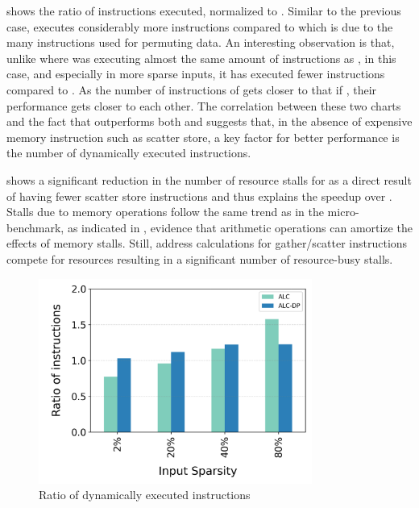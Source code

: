  shows the ratio of instructions executed, normalized to \ifconv. Similar to the previous case, \ALCdp executes considerably more instructions compared to \ALC which is due to the many instructions used for permuting data. An interesting observation is that, unlike  where \ALC was executing almost the same amount of instructions as \ifconv, in this case, and especially in more sparse inputs, it has executed fewer instructions compared to \ifconv.
As the number of instructions of \ALC gets closer to that if \ifconv, their performance gets closer to each other. The correlation between these two charts and the fact that \ALCdp outperforms both \ALC and \ifconv suggests that, in the absence of expensive memory instruction such as scatter store, a key factor for better performance is the number of dynamically executed instructions.

 shows a significant reduction in the number of resource stalls for \ALCdp as a direct result of having fewer scatter store instructions and thus explains the speedup over \ifconv.
Stalls due to memory operations follow the same trend as in the \ifElseBench micro-benchmark, as indicated in , evidence that arithmetic operations can amortize the effects of memory stalls.
Still, address calculations for gather/scatter instructions compete for resources resulting in a significant number of resource-busy stalls. 



\begin{figure}[h!]
  \includegraphics[width=0.8\textwidth]{Figures/Evaluations/single_if_many_scatter_instr.png}
  \caption{Ratio of dynamically executed instructions}
  \label{fig:single-if-many-scatter-inst}
\end{figure}

